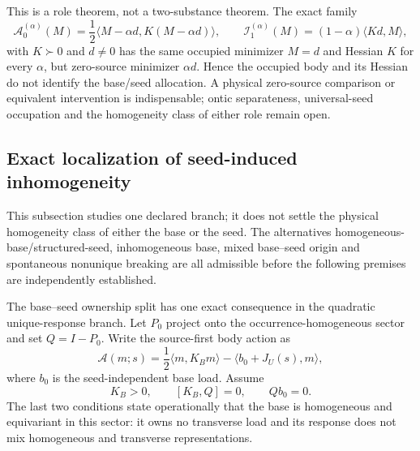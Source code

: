 \documentclass[11pt]{article}
\begin{document}
This is a role theorem, not a two-substance theorem.  The exact family
\begin{equation}
 \mathcal A_0^{(\alpha)}(M)
 =\frac12\langle M-\alpha d,K(M-\alpha d)\rangle,
 \qquad
 \mathcal I_1^{(\alpha)}(M)
 =(1-\alpha)\langle Kd,M\rangle,
 \label{eq:seed-base-ownership-counterfamily}
\end{equation}
with $K\succ0$ and $d\ne0$ has the same occupied minimizer $M=d$ and Hessian
$K$ for every $\alpha$, but zero-source minimizer $\alpha d$.  Hence the
occupied body and its Hessian do not identify the base/seed allocation.  A
physical zero-source comparison or equivalent intervention is indispensable;
ontic separateness, universal-seed occupation and the homogeneity class of
either role remain open.

\subsection{Exact localization of seed-induced inhomogeneity}

This subsection studies one declared branch; it does not settle the physical
homogeneity class of either the base or the seed. The alternatives
homogeneous-base/structured-seed, inhomogeneous base, mixed base--seed origin
and spontaneous nonunique breaking are all admissible before the following
premises are independently established.

The base--seed ownership split has one exact consequence in the quadratic
unique-response branch. Let $P_0$ project onto the occurrence-homogeneous
sector and set $Q=I-P_0$. Write the source-first body action as
\begin{equation}
 \mathcal A(m;s)=\frac12\langle m,K_Bm\rangle
 -\langle b_0+J_U(s),m\rangle,
 \label{eq:seed-localization-action}
\end{equation}
where $b_0$ is the seed-independent base load. Assume
\begin{equation}
 K_B>0,\qquad [K_B,Q]=0,\qquad Qb_0=0.
 \label{eq:seed-localization-premises}
\end{equation}
The last two conditions state operationally that the base is homogeneous and
equivariant in this sector: it owns no transverse load and its response does
not mix homogeneous and transverse representations.
\end{document}
